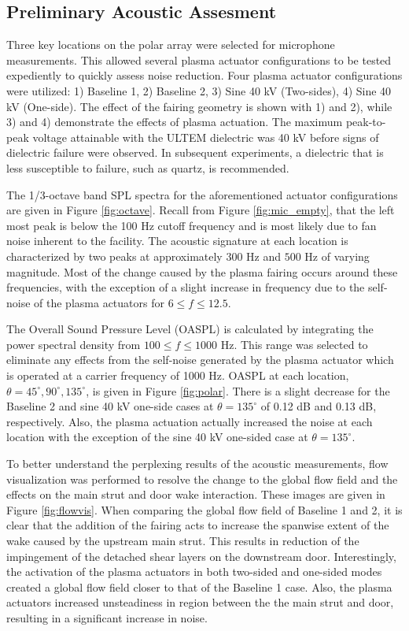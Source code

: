 \subsection{Preliminary Acoustic Assesment}
Three key locations on the polar array were selected for microphone measurements. This allowed several plasma actuator configurations to be tested expediently to quickly assess noise reduction. Four plasma actuator configurations were utilized: 1) Baseline 1, 2) Baseline 2, 3) Sine 40 kV (Two-sides), 4) Sine 40 kV (One-side). The effect of the fairing geometry is shown with 1) and 2), while 3) and 4) demonstrate the effects of plasma actuation. The maximum peak-to-peak voltage attainable with the ULTEM dielectric was 40 kV before signs of dielectric failure were observed. In subsequent experiments, a dielectric that is less susceptible to failure, such as quartz, is recommended. 

The 1/3-octave band SPL spectra for the aforementioned actuator configurations are given in Figure \ref{fig:octave}. Recall from Figure \ref{fig:mic_empty}, that the left most peak is below the 100 Hz cutoff frequency and is most likely due to fan noise inherent to the facility. The acoustic signature at each location is characterized by two peaks at approximately $300$ Hz and $500$ Hz of varying magnitude. Most of the change caused by the plasma fairing occurs around these frequencies, with the exception of a slight increase in frequency due to the self-noise of the plasma actuators for $6 \leq f \leq 12.5$. 

The Overall Sound Pressure Level (OASPL) is calculated by integrating the power spectral density from $100 \leq f \leq 1000$ Hz. This range was selected to eliminate any effects from the self-noise generated by the plasma actuator which is operated at a carrier frequency of 1000 Hz. OASPL at each location, $\theta = 45^\circ, 90^\circ, 135^\circ$, is given in Figure \ref{fig:polar}. There is a slight decrease for the Baseline 2 and sine 40 kV one-side cases at $\theta = 135^\circ$ of 0.12 dB and 0.13 dB, respectively. Also, the plasma actuation actually increased the noise at each location with the exception of the sine 40 kV one-sided case at $\theta = 135^\circ$. 

To better understand the perplexing results of the acoustic measurements, flow visualization was performed to resolve the change to the global flow field and the effects on the main strut and door wake interaction. These images are given in Figure \ref{fig:flowvis}.  When comparing the global flow field of Baseline 1 and 2, it is clear that the addition of the fairing acts to increase the spanwise extent of the wake caused by the upstream main strut. This results in reduction of the impingement of the detached shear layers on the downstream door. Interestingly, the activation of the plasma actuators in both two-sided and one-sided modes created a global flow field closer to that of the Baseline 1 case. Also, the plasma actuators increased unsteadiness in region between the the main strut and door, resulting in a significant increase in noise. 


